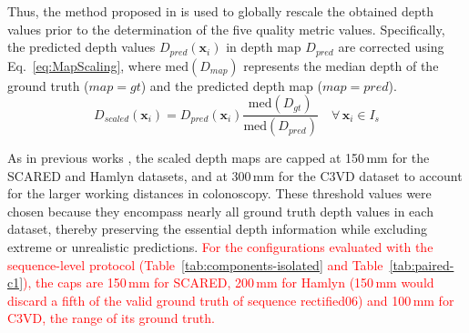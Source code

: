 \documentclass[a4paper,fleqn]{cas-dc}
\begin{document}
{Thus, the method proposed in \citep{Godard_ICCV_2019} is used to globally rescale the obtained depth values prior to the determination of the five quality metric values. Specifically, the predicted depth values \( D_{pred}(\mathbf{x}_i) \) in depth map \( D_{pred} \) are corrected using Eq.~\eqref{eq:MapScaling}, where \( \textrm{med}(D_{map}) \) represents the median depth of the ground truth (\( map = gt \)) and the predicted depth map (\( map = pred \)).
%
\begin{equation} \label{eq:MapScaling}
    D_{scaled}(\mathbf{x}_i) = D_{pred}(\mathbf{x}_i) \frac{\textrm{med}(D_{gt})} {\textrm{med}(D_{pred})} \quad \forall \, \mathbf{x}_i \in I_s
\end{equation}
%

As in previous works \citep{Godard_ICCV_2019,Ozyoruk_MIA_2021,Shao_MIA_2022}, the scaled depth maps are capped at 150\,mm for the SCARED and Hamlyn datasets, and at 300\,mm for the C3VD dataset to account for the larger working distances in colonoscopy. These threshold values were chosen because they encompass nearly all ground truth depth values in each dataset, thereby preserving the essential depth information while excluding extreme or unrealistic predictions.
\textcolor{red}{For the configurations evaluated with the sequence-level protocol (Table~\ref{tab:components-isolated} and Table~\ref{tab:paired-c1}), the caps are 150\,mm for SCARED, 200\,mm for Hamlyn (150\,mm would discard a fifth of the valid ground truth of sequence rectified06) and 100\,mm for C3VD, the range of its ground truth.}

}
\end{document}
